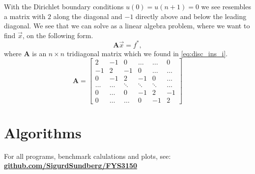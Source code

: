 \documentclass[10pt, a4paper]{amsart}
\begin{document}
With the Dirichlet boundary conditions $u(0) = u(n+1) = 0$ we see resembles a matrix with $2$ along the diagonal and $-1$ directly above and below the leading diagonal. We see that we can solve as a linear algebra problem, where we want to find $\vec{x}$, on the following form. 
\begin{equation}
\mathbf{A}\vec{x} = f^*, \nonumber
\end{equation}
where $\mathbf{A}$ is an $n\times n$ tridiagonal matrix which we found in \ref{eq:disc_ins_i}.
\begin{equation}\label{mat:tridiag_1_n}
\mathbf{A} = 
\begin{bmatrix}
2 & -1 & 0 & \dots & \dots & 0 \\
-1 & 2 & -1 & 0 & \dots & \dots \\
0 & -1 & 2 & -1 & 0 & \dots \\
\dots & \dots & \ddots & \ddots & \ddots & \dots\\
0 & \dots & 0 & -1 & 2 & -1 \\
0 & \dots & \dots & 0 & -1 & 2
\end{bmatrix}
\end{equation}

\section{Algorithms} 
For all programs, benchmark calulations and plots, see: \\
\href{https://github.com/SigurdSundberg/FYS3150/tree/master/project1}{\textbf{github.com/SigurdSundberg/FYS3150}}
\end{document}
